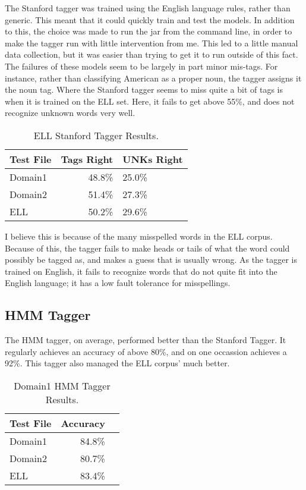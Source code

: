 \documentclass[11pt,a4paper]{article}
\begin{document}
The Stanford tagger was trained using the English language rules, rather
than generic. This meant that it could quickly train and test the models.
In addition to this, the choice was made to run the jar from the
command line, in order to make the tagger run with little intervention
from me. This led to a little manual data collection, but it was easier
than trying to get it to run outside of this fact. The failures of these
models seem to be largely in part minor mis-tags. For instance, rather than
classifying American as a proper noun, the tagger assigns it the noun tag.
Where the Stanford tagger seems to miss quite a bit of tags is when it
is trained on the ELL set. Here, it fails to get above 55\%, and does not
recognize unknown words very well.

\begin{table}[h]
  \begin{center}
  \begin{tabular}{|l|rl|}
  \hline \bf Test File & \bf Tags Right & \bf UNKs Right \\ \hline
  Domain1 & 48.8\% & 25.0\% \\
  Domain2 & 51.4\% & 27.3\% \\
  ELL  & 50.2\% & 29.6\% \\
  \hline
  \end{tabular}
  \end{center}
  \caption{\label{ellSt-table} ELL Stanford Tagger Results. }
\end{table}

I believe this is because of the many misspelled words in the ELL corpus.
Because of this, the tagger fails to make heads or tails of what the
word could possibly be tagged as, and makes a guess that is usually wrong.
As the tagger is trained on English, it fails to recognize words that
do not quite fit into the English language; it has a low fault tolerance
for misspellings.

\subsection{HMM Tagger}

The HMM tagger, on average, performed better than the Stanford Tagger.
It regularly achieves an accuracy of above 80\%, and on one occassion
achieves a 92\%. This tagger also managed the ELL corpus' much better.

\begin{table}[h]
  \begin{center}
  \begin{tabular}{|l|rl|}
  \hline \bf Test File & \bf Accuracy \\ \hline
  Domain1 & 84.8\% \\
  Domain2 & 80.7\%  \\
  ELL  & 83.4\%  \\
  \hline
  \end{tabular}
  \end{center}
  \caption{\label{d1HMM-table} Domain1 HMM Tagger Results. }
\end{table}
\end{document}
